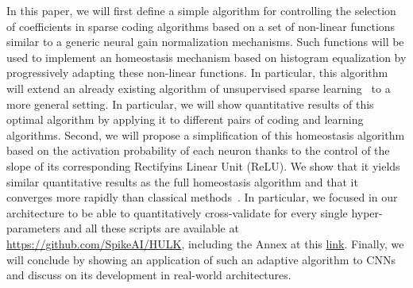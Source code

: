 \documentclass[letterpaper,final,conference,10pt]{IEEEtran}
\newcommand{\citep}[1]{\cite{#1}}
\begin{document}
In this paper, we will first define a simple algorithm for controlling the selection of coefficients in sparse coding algorithms based on a set of non-linear functions similar to a generic neural gain normalization mechanisms. Such functions will be used to implement an homeostasis mechanism based on histogram equalization by progressively adapting these non-linear functions. In particular, this algorithm will extend an already existing algorithm of unsupervised sparse learning~\citep{Perrinet10shl} to a more general setting. In particular, we will show quantitative results of this optimal algorithm by applying it to different pairs of coding and learning algorithms. Second, we will propose a simplification of this homeostasis algorithm based on the activation probability of each neuron thanks to the control of the slope of its corresponding Rectifyins Linear Unit (ReLU). We show that it yields similar quantitative results as the full homeostasis algorithm and that it converges more rapidly than classical methods~\citep{Olshausen97, Sandin17}. In particular, we focused in our architecture to be able to quantitatively cross-validate for every single hyper-parameters and all these scripts are available at \url{https://github.com/SpikeAI/HULK}, including the Annex at this \href{https://github.com/laurentperrinet/HULK/raw/master/Annex.pdf}{link}. %
Finally, we will conclude by showing an application of such an adaptive algorithm to CNNs and discuss on its development in real-world architectures.
%
%
\end{document}
